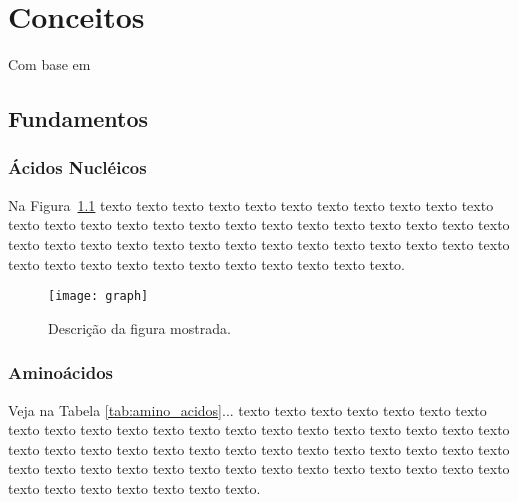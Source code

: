 \chapter{Conceitos}
\label{cap:conceitos}

Com base em \cite{explai:19}

\section{Fundamentos}
\label{sec:fundamentos}


\subsection{Ácidos Nucléicos}
\label{sec:acidos_nucleicos}

Na Figura~\ref{fig:humanbeta} texto texto texto texto texto texto texto texto
texto texto texto texto texto texto texto texto texto texto texto texto texto
texto texto texto texto texto texto texto texto texto texto texto texto texto
texto texto texto texto texto texto texto texto texto texto texto texto texto
texto texto texto.

\begin{figure}[!h]
  \centering
  \texttt{[image: graph]} 
  \caption{Descrição da figura mostrada.}
  \label{fig:humanbeta} 
\end{figure}

\subsection{Aminoácidos}
\label{sec:amino_acidos}

Veja na Tabela \ref{tab:amino_acidos}...  texto texto texto texto texto texto
texto texto texto texto texto texto texto texto texto texto texto texto texto
texto texto texto texto texto texto texto texto texto texto texto texto texto
texto texto texto texto texto texto texto texto texto texto texto texto texto
texto texto texto texto texto texto texto texto texto texto texto.

